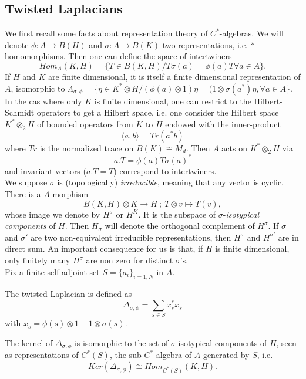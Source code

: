 \subsection{Twisted Laplacians}

We first recall some facts about representation theory of $C^*$-algebras. We will denote $\phi : A \rightarrow B(H)$ and $\sigma : A \rightarrow B(K)$ two representations, i.e. $*$-homomorphisms. Then one can define the space of intertwiners
\[Hom_A(K,H) = \{ T\in B(K,H) / T \sigma (a) = \phi(a) T \forall a \in A \}.\]
If $H$ and $K$ are finite dimensional, it is itself a finite dimensional representation of $A$, isomorphic to $\Lambda_{\sigma,\phi} =\{\eta \in K^* \otimes H / (\phi(a)\otimes 1)\eta = (1\otimes \sigma(a^*)\eta, \forall a\in A\}$. \\

In the cas where only $K$ is finite dimensional, one can restrict to the Hilbert-Schmidt operators to get a Hilbert space, i.e. one consider the Hilbert space $K^*\otimes_2 H$ of bounded operators from $K$ to $H$ endowed with the inner-product
\[\langle a, b \rangle = Tr(a^* b) \]
where $Tr$ is the normalized trace on $B(K)\cong M_d$. Then $A$ acts on $K^*\otimes_2 H$ via
\[ a. T = \phi(a)T\sigma(a)^*\]
and invariant vectors ($ a.T = T$) correspond to intertwiners. \\ 
 
We suppose $\sigma$ is (topologically) \textit{irreducible}, meaning that any vector is cyclic. There is a $A$-morphism 
\[B(K,H) \otimes K \rightarrow H \ ;\  T\otimes v \mapsto T(v),\]
whose image we denote by $H^\sigma$ or $H^K$. It is the subspace of $\sigma$-\textit{isotypical components} of $H$. Then $H_\sigma$ will denote the orthogonal complement of $H^\sigma$. If $\sigma$ and $\sigma'$ are two non-equivalent irreducible representations, then $H^\sigma$ and $H^{\sigma'}$ are in direct sum. An important consequence for us is that, if $H$ is finite dimensional, only finitely many $H^\sigma$ are non zero for distinct $\sigma$'s.\\

Fix a finite self-adjoint set $S= \{a_i\}_{i=1,N}$ in $A$.

\begin{definition} 
The twisted Laplacian is defined as 
\[\Delta_{\sigma, \phi} = \sum_{s\in S} x_s^* x_s \] with $x_s =  \phi(s) \otimes 1 - 1 \otimes \sigma(s)$.
\end{definition}

\begin{lem}
The kernel of $\Delta_{\sigma,\phi}$ is isomorphic to the set of $\sigma$-isotypical components of $H$, seen as representations of $C^*(S)$, the sub-$C^*$-algebra of $A$ generated by $S$, i.e.
\[Ker (\Delta_{\sigma, \phi}) \cong Hom_{C^*(S)}(K,H).\] 
\end{lem}

